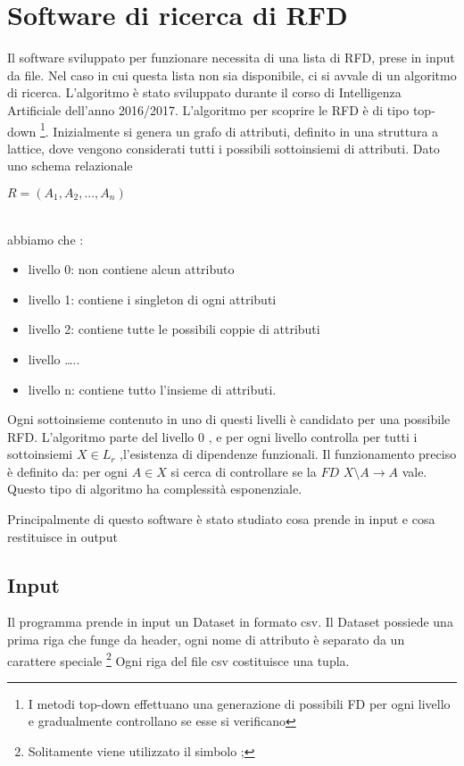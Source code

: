\section{Software di ricerca di RFD}
Il software sviluppato per funzionare necessita di una lista di RFD, prese in input da file. Nel caso in cui questa lista non sia disponibile, ci si avvale di un algoritmo di ricerca.
L’algoritmo è stato sviluppato durante il corso di Intelligenza Artificiale dell’anno 2016/2017.
L’algoritmo per scoprire le RFD è di tipo top-down \footnote{I metodi top-down effettuano una generazione di possibili FD per ogni livello e gradualmente controllano se esse si verificano}.
Inizialmente si genera un grafo di attributi, definito in una struttura a lattice, dove vengono considerati tutti i possibili sottoinsiemi di attributi. Dato uno schema relazionale
\\ \centerline{$R=(A_1,A_2,...,A_n)$} \\abbiamo che :
\begin{itemize}[noitemsep]
\item livello 0: non contiene alcun attributo
\item livello 1: contiene i singleton di ogni attributi
\item livello 2: contiene tutte le possibili coppie di attributi
\item livello …..
\item livello n: contiene tutto l’insieme di attributi.
\end{itemize}
Ogni sottoinsieme contenuto in uno di questi livelli è candidato per una possibile RFD.
L’algoritmo parte del livello 0 , e per ogni livello controlla per tutti i sottoinsiemi $X \in L_r$ ,l’esistenza di dipendenze funzionali.
Il funzionamento preciso è definito da:
per ogni $A \in X$ si cerca di controllare se la $FD$  $X\setminus A \xrightarrow{}  A $ vale. Questo tipo di algoritmo ha complessità esponenziale.

Principalmente di questo software è stato studiato cosa prende in input e cosa restituisce in output

\subsection{Input}
Il programma prende in input un Dataset in formato csv.
Il Dataset possiede una prima riga che funge da header, ogni nome di attributo è separato da un carattere speciale \footnote{Solitamente viene utilizzato il simbolo  ;  }
Ogni riga del file csv costituisce una tupla.

